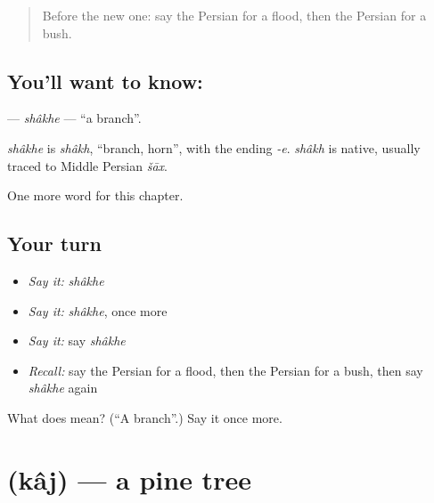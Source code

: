 \label{lesson:FA-C244-shakhe}



\begin{quote}
Before the new one: say the Persian for a flood, then the Persian for a bush.
\end{quote}

\subsection*{You'll want to know: }
\textbf{} — \emph{shâkhe} — \textquotedblleft{}a branch\textquotedblright{}.

\begin{cousinweb}
\emph{shâkhe} is \emph{shâkh}, \textquotedblleft{}branch, horn\textquotedblright{}, with the ending \emph{-e}. \emph{shâkh} is native, usually traced to Middle Persian \emph{šāx}.
\end{cousinweb}

\begin{grammarlens}[title={What you've built}]
One more word for this chapter.
\end{grammarlens}

\subsection*{Your turn}
\begin{itemize}
\raggedright
  \item \emph{Say it:} \emph{shâkhe}
  \item \emph{Say it:} \emph{shâkhe}, once more
  \item \emph{Say it:} say \emph{shâkhe}
  \item \emph{Recall:} say the Persian for a flood, then the Persian for a bush, then say \emph{shâkhe} again
\end{itemize}

\begin{tcolorbox}[breakable,colback=teal!4,colframe=teal!35!black,title={Before you move on}]
What does  mean? (\textquotedblleft{}A branch\textquotedblright{}.) Say it once more.
\end{tcolorbox}
\section[\texorpdfstring{\fa{کاج} (kâj)}{کاج (kâj)}]{ (kâj) — a pine tree}

\label{lesson:FA-C244-kaj2}



